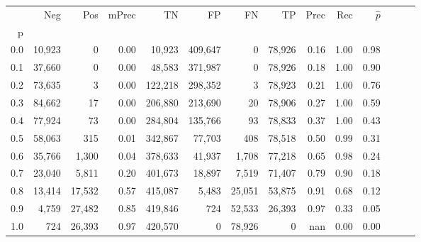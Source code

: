 \begin{tabular}{rrrrrrrrrrrrrr}
\toprule
{} &     Neg &     Pos & mPrec &       TN &       FP &      FN &      TP &  Prec &   Rec & $\hat{p}$ \\
p   &         &         &       &          &          &         &         &       &       &           \\
\midrule
0.0 &  10,923 &       0 &  0.00 &   10,923 &  409,647 &       0 &  78,926 &  0.16 &  1.00 &      0.98 \\
0.1 &  37,660 &       0 &  0.00 &   48,583 &  371,987 &       0 &  78,926 &  0.18 &  1.00 &      0.90 \\
0.2 &  73,635 &       3 &  0.00 &  122,218 &  298,352 &       3 &  78,923 &  0.21 &  1.00 &      0.76 \\
0.3 &  84,662 &      17 &  0.00 &  206,880 &  213,690 &      20 &  78,906 &  0.27 &  1.00 &      0.59 \\
0.4 &  77,924 &      73 &  0.00 &  284,804 &  135,766 &      93 &  78,833 &  0.37 &  1.00 &      0.43 \\
0.5 &  58,063 &     315 &  0.01 &  342,867 &   77,703 &     408 &  78,518 &  0.50 &  0.99 &      0.31 \\
0.6 &  35,766 &   1,300 &  0.04 &  378,633 &   41,937 &   1,708 &  77,218 &  0.65 &  0.98 &      0.24 \\
0.7 &  23,040 &   5,811 &  0.20 &  401,673 &   18,897 &   7,519 &  71,407 &  0.79 &  0.90 &      0.18 \\
0.8 &  13,414 &  17,532 &  0.57 &  415,087 &    5,483 &  25,051 &  53,875 &  0.91 &  0.68 &      0.12 \\
0.9 &   4,759 &  27,482 &  0.85 &  419,846 &      724 &  52,533 &  26,393 &  0.97 &  0.33 &      0.05 \\
1.0 &     724 &  26,393 &  0.97 &  420,570 &        0 &  78,926 &       0 &   nan &  0.00 &      0.00 \\
\bottomrule
\end{tabular}
